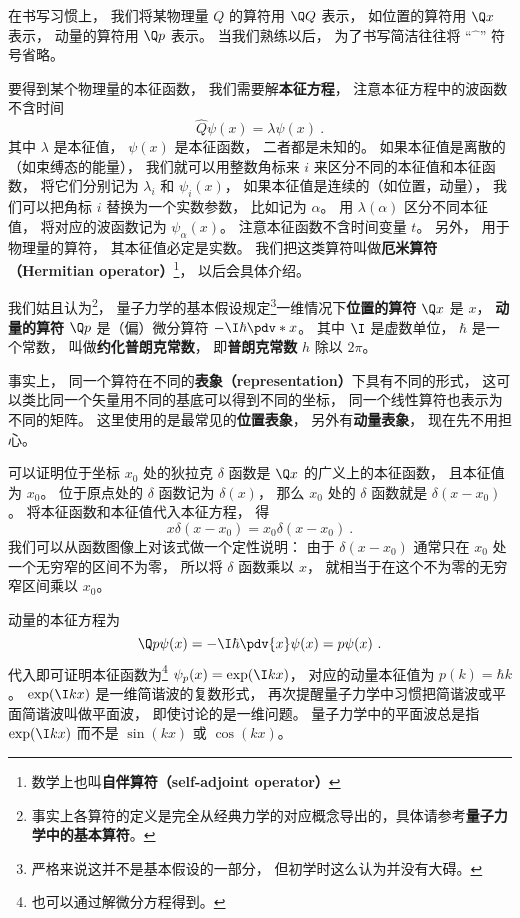 在书写习惯上， 我们将某物理量 $Q$ 的算符用 $\Q Q$ 表示， 如位置的算符用 $\Q x$ 表示， 动量的算符用 $\Q p$ 表示。 当我们熟练以后， 为了书写简洁往往将 “$\hat{\phantom{x}}$” 符号省略。

要得到某个物理量的本征函数， 我们需要解\textbf{本征方程}， 注意本征方程中的波函数不含时间
\begin{equation}
\hat Q \psi(x) = \lambda \psi(x)~.
\end{equation}
其中 $\lambda$ 是本征值， $\psi(x)$ 是本征函数， 二者都是未知的。 如果本征值是离散的（如束缚态的能量）， 我们就可以用整数角标来 $i$ 来区分不同的本征值和本征函数， 将它们分别记为 $\lambda_i$ 和 $\psi_i(x)$， 如果本征值是连续的（如位置，动量）， 我们可以把角标 $i$ 替换为一个实数参数， 比如记为 $\alpha$。 用 $\lambda(\alpha)$ 区分不同本征值， 将对应的波函数记为 $\psi_\alpha(x)$。 注意本征函数不含时间变量 $t$。 另外， 用于物理量的算符， 其本征值必定是实数。 我们把这类算符叫做\textbf{厄米算符（Hermitian operator）}\footnote{数学上也叫\textbf{自伴算符（self-adjoint operator）}}， 以后会具体介绍。

我们姑且认为\footnote{事实上各算符的定义是完全从经典力学的对应概念导出的，具体请参考\textbf{量子力学中的基本算符}。}， 量子力学的基本假设规定\footnote{严格来说这并不是基本假设的一部分， 但初学时这么认为并没有大碍。}一维情况下\textbf{位置的算符} $\Q x$ 是 $x$， \textbf{动量的算符} $\Q p$ 是（偏）微分算符 $-\I\hbar \pdv*{x}$。 其中 $\I$ 是虚数单位， $\hbar$ 是一个常数， 叫做\textbf{约化普朗克常数}， 即\textbf{普朗克常数} $h$ 除以 $2\pi$。

事实上， 同一个算符在不同的\textbf{表象（representation）}下具有不同的形式， 这可以类比同一个矢量用不同的基底可以得到不同的坐标， 同一个线性算符也表示为不同的矩阵。%
这里使用的是最常见的\textbf{位置表象}， 另外有\textbf{动量表象}， 现在先不用担心。

可以证明位于坐标 $x_0$ 处的狄拉克 $\delta$ 函数是 $\Q x$ 的广义上的本征函数， 且本征值为 $x_0$。 位于原点处的 $\delta$ 函数记为 $\delta(x)$， 那么 $x_0$ 处的 $\delta$ 函数就是 $\delta (x - x_0)$。 将本征函数和本征值代入本征方程， 得
\begin{equation}
x \delta(x - x_0) = x_0 \delta(x - x_0)~.
\end{equation}
我们可以从函数图像上对该式做一个定性说明： 由于 $\delta(x - x_0)$ 通常只在 $x_0$ 处一个无穷窄的区间不为零， 所以将 $\delta$ 函数乘以 $x$， 就相当于在这个不为零的无穷窄区间乘以 $x_0$。

动量的本征方程为
\begin{equation}
\Q p \psi(x) = -\I\hbar \pdv{x} \psi(x) = p \psi(x)~.
\end{equation}
代入即可证明本征函数为\footnote{也可以通过解微分方程得到。} $\psi_p(x) = \exp(\I k x)$， 对应的动量本征值为 $p(k) = \hbar k$。 $\exp(\I k x)$ 是一维简谐波的复数形式， 再次提醒量子力学中习惯把简谐波或平面简谐波叫做平面波， 即使讨论的是一维问题。 量子力学中的平面波总是指 $\exp(\I k x)$ 而不是 $\sin(kx)$ 或 $\cos(kx)$。

